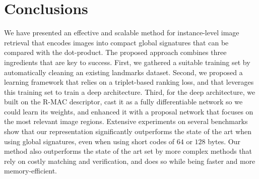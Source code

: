 \documentclass[twocolumn]{svjour3}          \smartqed  \usepackage{graphicx}
\begin{document}
\section{Conclusions}
 \label{sec:conclusions}

 We have presented an effective and scalable method for instance-level image retrieval that encodes images into compact global signatures that can be compared with the dot-product.
 The proposed approach combines three ingredients that are key to success. First, we gathered a suitable training set by automatically cleaning an existing landmarks dataset. Second, we proposed a learning framework that relies on a triplet-based ranking loss, and that leverages this training set to train a deep architecture. Third, for the deep architecture, we built on the R-MAC descriptor, cast it as a fully differentiable network so we could learn its weights, and enhanced it with a proposal network that focuses on the most relevant image regions.
 Extensive experiments on several benchmarks show that our representation significantly outperforms the state of the art when using global signatures, even when using short codes of $64$ or $128$ bytes.
Our method also outperforms the state of the art set by more complex methods that rely on costly matching and verification, and does so while being faster and more memory-efficient.












         
\end{document}
